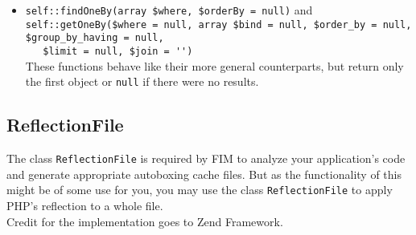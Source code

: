 \documentclass{scrartcl}
\begin{document}
\begin{itemize}
         \item \lstinline!self::findOneBy(array $where, $orderBy = null)! and \\
            \lstinline!self::getOneBy($where = null, array $bind = null, $order_by = null, $group_by_having = null,! \\ \lstinline!   $limit = null, $join = '')! \\
            These functions behave like their more general counterparts, but return only the first object or \lstinline!null! if there were no results.
      \end{itemize}
   \subsection{ReflectionFile}
      The class \lstinline!ReflectionFile! is required by FIM to analyze your application's code and generate appropriate autoboxing cache files. But as the functionality of this might be of some use for you, you may use the class \lstinline!ReflectionFile! to apply PHP's reflection to a whole file. \\
      Credit for the implementation goes to Zend Framework.
\end{document}
